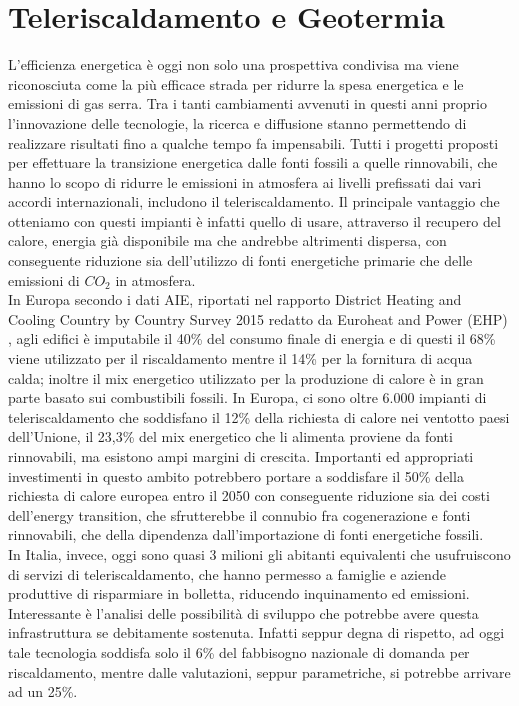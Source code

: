 \documentclass[laurea,oneside,11pt]{USiena_tesiLM}
\begin{document}
\chapter{Teleriscaldamento e Geotermia}
L'efficienza energetica è oggi non solo una prospettiva condivisa ma viene riconosciuta come la più efficace strada per ridurre la spesa energetica e le emissioni di gas serra. Tra i tanti cambiamenti avvenuti in questi anni proprio l'innovazione delle tecnologie, la ricerca e diffusione stanno permettendo di realizzare risultati fino a qualche tempo fa impensabili. Tutti i progetti proposti per effettuare la transizione energetica dalle fonti fossili a quelle rinnovabili, che hanno lo scopo di ridurre le emissioni in atmosfera ai livelli prefissati dai vari accordi internazionali, includono il teleriscaldamento.
Il principale vantaggio che otteniamo con questi impianti è infatti quello di usare, attraverso il recupero del calore, energia già disponibile ma che andrebbe altrimenti dispersa, con conseguente riduzione sia dell'utilizzo di fonti energetiche primarie che delle emissioni di $CO_2$ in atmosfera.\\

In Europa secondo i dati AIE, riportati nel rapporto District Heating and Cooling Country by Country Survey 2015 redatto da Euroheat and Power (EHP) \cite{heating2015cooling}, agli edifici è imputabile il 40\% del consumo finale di energia e di questi il 68\% viene utilizzato per il riscaldamento mentre il 14\% per la fornitura di acqua calda; inoltre il mix energetico utilizzato per la produzione di calore è in gran parte basato sui combustibili fossili. In Europa, ci sono oltre 6.000 impianti di teleriscaldamento che soddisfano il 12\% della richiesta di calore nei ventotto paesi dell'Unione, il 23,3\% del mix energetico che li alimenta proviene da fonti rinnovabili, ma esistono ampi margini di crescita. Importanti ed appropriati investimenti in questo ambito potrebbero portare a soddisfare il 50\% della richiesta di calore europea entro il 2050 con conseguente riduzione sia dei costi dell'energy transition, che sfrutterebbe il connubio fra cogenerazione e fonti rinnovabili, che della dipendenza dall'importazione di fonti energetiche fossili.\\

In Italia, invece, oggi sono quasi 3 milioni gli abitanti equivalenti che usufruiscono di servizi di teleriscaldamento, che hanno permesso a famiglie e aziende produttive di risparmiare in bolletta, riducendo inquinamento ed emissioni. 
Interessante è l'analisi delle possibilità di sviluppo che potrebbe avere questa infrastruttura se debitamente sostenuta. Infatti seppur degna di rispetto, ad oggi tale tecnologia soddisfa solo il 6\% del fabbisogno nazionale di domanda per riscaldamento, mentre dalle valutazioni, seppur parametriche, si potrebbe arrivare ad un 25\%.\\
\end{document}
